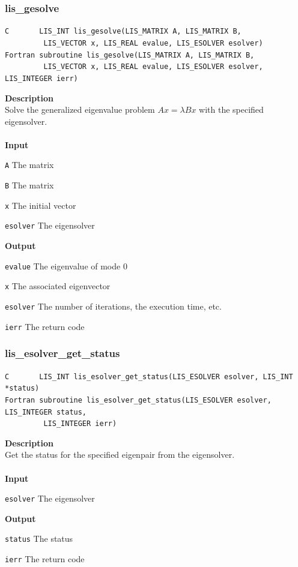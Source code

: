 \documentclass[a4paper]{article}
\newcommand{\namelistlabel}[1]{\mbox{#1}\hfill}
\newenvironment{namelist}[1]{%
\begin{list}{}
  {\let\makelabel\namelistlabel
  \settowidth{\labelwidth}{#1}
  \setlength{\leftmargin}{1.1\labelwidth}}
  }{%
\end{list}}
\begin{document}
\subsubsection{lis\_gesolve}
\begin{screen}
\verb|C       LIS_INT lis_gesolve(LIS_MATRIX A, LIS_MATRIX B,|\\ 
\verb|         LIS_VECTOR x, LIS_REAL evalue, LIS_ESOLVER esolver)|\\
\verb|Fortran subroutine lis_gesolve(LIS_MATRIX A, LIS_MATRIX B,|\\
\verb|         LIS_VECTOR x, LIS_REAL evalue, LIS_ESOLVER esolver, LIS_INTEGER ierr)|
\end{screen}
{\bf Description}\\
\indent
Solve the generalized eigenvalue problem $Ax = \lambda Bx$ with the specified eigensolver.
\\ \\
\noindent
{\bf Input}
\begin{namelist}{XXXXXXXXXXXXXXXXXXXX}
\item[\tt A] The matrix
\item[\tt B] The matrix  
\item[\tt x] The initial vector
\item[\tt esolver] The eigensolver
\end{namelist}
{\bf Output}
\begin{namelist}{XXXXXXXXXXXXXXXXXXXX}
\item[\tt evalue] The eigenvalue of mode 0
\item[\tt x] The associated eigenvector
\item[\tt esolver] The number of iterations, the execution time, etc.
\item[\tt ierr] The return code
\end{namelist}

\newpage
\subsubsection{lis\_esolver\_get\_status}
\begin{screen}
\verb|C       LIS_INT lis_esolver_get_status(LIS_ESOLVER esolver, LIS_INT *status)|\\
\verb|Fortran subroutine lis_esolver_get_status(LIS_ESOLVER esolver, LIS_INTEGER status,|\\
\verb|         LIS_INTEGER ierr)|
\end{screen}
{\bf Description}\\
\indent
Get the status for the specified eigenpair from the eigensolver.
\\ \\
\noindent
{\bf Input}
\begin{namelist}{XXXXXXXXXXXXXXXXXXXX}
\item[\tt esolver] The eigensolver
\end{namelist}
{\bf Output}
\begin{namelist}{XXXXXXXXXXXXXXXXXXXX}
\item[\tt status] The status
\item[\tt ierr] The return code
\end{namelist}
\end{document}

